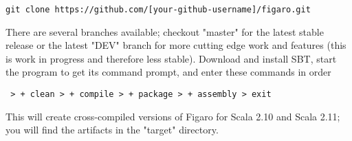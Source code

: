 \texttt{git clone https://github.com/[your-github-username]/figaro.git}

There are several branches available; checkout "master" for the latest stable release or the latest "DEV" branch for more cutting edge work and features (this is work in progress and therefore less stable). Download and install SBT, start the program to get its command prompt, and enter these commands in order

\texttt{
\newline > + clean
\newline > + compile
\newline > + package
\newline > + assembly
\newline > exit
}
\newline

This will create cross-compiled versions of Figaro for Scala 2.10 and Scala 2.11; you will find the artifacts in the "target" directory.

